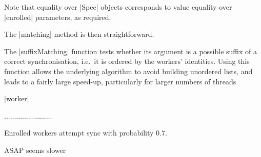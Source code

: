 Note that equality over |Spec| objects corresponds to value equality over
|enrolled| parameters, as required.  

The |matching| method is then straightforward. 

The |suffixMatching| function tests whether its argument is a possible suffix
of a correct synchronisation, i.e.~it is ordered by the workers' identities.
Using this function allows the underlying algorithm to avoid building
unordered lists, and leads to a fairly large speed-up, particularly for larger
numbers of threads 


|worker|

........................

Enrolled workers attempt sync with probability $0.7$. 

ASAP seems slower
